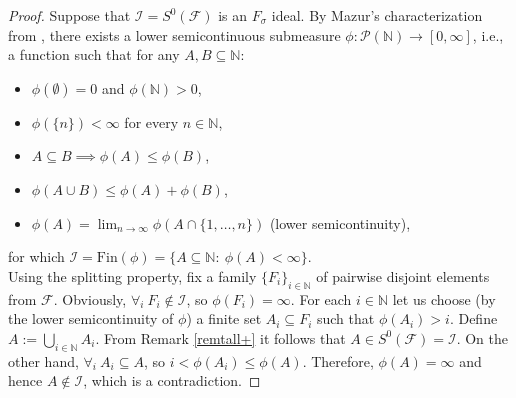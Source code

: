 \documentclass{amsart}
\theoremstyle{definition}
\theoremstyle{definition}
\newcommand{\N}{{\mathbb N}}
\newcommand{\Fin}{\textrm{Fin}}
\newcommand{\I}{\mathcal I}
\newcommand{\MB}{S^0}  %
\begin{document}
\begin{proof} %
Suppose that $\I=\MB(\mathcal{F})$ is an $F_\sigma$ ideal.
By Mazur's characterization from \cite{Maz}, there exists a lower semicontinuous submeasure $\phi\colon\mathcal{P}(\N)\to [0, \infty]$, i.e., a function such that for any $A,B\subseteq\N$:
\begin{itemize}
\item $\phi(\emptyset)=0$ and $\phi(\N)>0$,
\item $\phi(\{n\})<\infty$ for every $n\in\N$,
\item $A\subseteq B \implies\phi(A)\leq \phi(B)$,
\item $\phi(A\cup B) \leq \phi(A) + \phi(B)$,
\item \label{continuity-condition} $\phi(A)=\lim_{n\to\infty} \phi(A \cap \{1,\ldots,n\})$ (lower semicontinuity),
\end{itemize}
for which $\I= \Fin(\phi)=\{A\subseteq \N :\ \phi(A)<\infty\}$.\\
Using the splitting property, fix a family $\{F_i\}_{i\in\N}$ of pairwise disjoint elements from $\mathcal{F}$.
Obviously, $\forall_{i}\ F_i\notin\I$, so $\phi(F_i)=\infty$. For each $i\in\N$ let us choose (by the lower semicontinuity of $\phi$) 
a finite set $A_i\subseteq F_i$ such that $\phi(A_i)>i$. Define $A:=\bigcup_{i\in\N}{A_i}$. From Remark \ref{remtall+}
it follows that $A\in S^0(\mathcal{F}) = \I$. On the other hand, $\forall_{i}\ A_i \subseteq A$, so $i<\phi(A_i)\leq \phi(A)$. Therefore, $\phi(A)=\infty$ and hence $A\notin\I$, which is a contradiction.
\end{proof}
\end{document}

